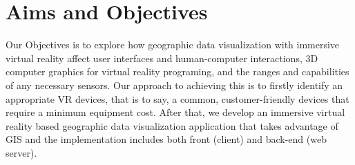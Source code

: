 \section{Aims and Objectives}

Our Objectives is to explore how geographic data visualization with immersive virtual reality affect user interfaces and human-computer interactions, 3D computer graphics for virtual reality programing, and the ranges and capabilities of any necessary sensors. Our approach to achieving this is to firstly identify an appropriate VR devices, that is to say, a common, customer-friendly devices that require a minimum equipment cost. After that, we develop an immersive virtual reality based geographic data visualization application that takes advantage of GIS and the implementation includes both front (client) and back-end (web server).

